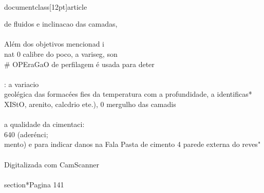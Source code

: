 \\documentclass[12pt]{article}
\begin{document}
de fluidos e inclinacao das camadas,\\
\\
Além dos objetivos mencionad i\\
nat 0 calibre do poco, a variseg, son \\# OPEraGaO de perfilagem é usada para deter\\
\\
: a variacio\\
geolégica das formacées fies da temperatura com a profundidade, a identificas*\\
XIStO, arenito, calcdrio ete.), 0 mergulho das camadis\\
\\
a qualidade da cimentaci:\\
640 (aderénci;\\
mento) e para indicar danos na Fala Pasta de cimento 4 parede externa do reves"\\
\\
Digitalizada com CamScanner\\

\\section*{Pagina 141}
\end{document}
